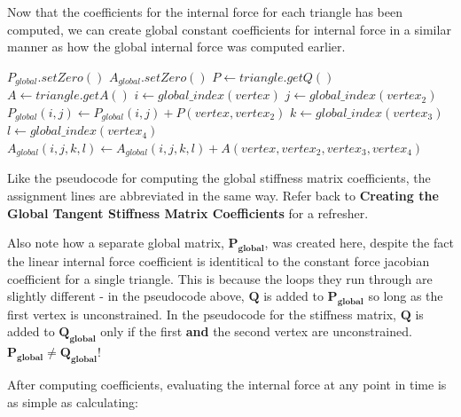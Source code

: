 \documentclass[twocolumn,10pt]{asme2ej}
\begin{document}
Now that the coefficients for the internal force for each triangle has been computed, we can create global constant coefficients for internal force in a similar manner as how the global internal force was computed earlier.

\begin{algorithmic}[1]
        \State $P_{global}.setZero()$
        \State $A_{global}.setZero()$
         \State $P \gets triangle.getQ()$
         \State $A \gets triangle.getA()$
                  \State $i \gets global\_index(vertex)$
                    \State $j \gets global\_index(vertex_2)$
                    \State $P_{global}(i,j) \gets P_{global}(i,j) + P(vertex, vertex_2)$
                          \State $k \gets global\_index(vertex_3)$
                              \State $l \gets global\_index(vertex_4)$
                              \State $A_{global}(i,j,k,l)  \gets A_{global}(i,j,k,l)+A(vertex, vertex_2, vertex_3, vertex_4)$
                            \EndFor
                      \EndFor
                    \EndFor
              \EndIf
            \EndFor
        \EndFor
    \EndFunction
\end{algorithmic}

Like the pseudocode for computing the global stiffness matrix coefficients, the assignment lines are abbreviated in the same way. Refer back to \textbf{Creating the Global Tangent Stiffness Matrix Coefficients} for a refresher.

Also note how a separate global matrix, $\bm{P_{global}}$, was created here, despite the fact the linear internal force coefficient is identitical to the constant force jacobian coefficient for a single triangle. This is because the loops they run through are slightly different - in the pseudocode above, $\bm{Q}$ is added to $\bm{P_{global}}$ so long as the first vertex is unconstrained. In the pseudocode for the stiffness matrix, $\bm{Q}$ is added to $\bm{Q_{global}}$ only if the first \textbf{and} the second vertex are unconstrained. $\bm{P_{global}} \neq \bm{Q_{global}}$!

After computing coefficients, evaluating the internal force at any point in time is as simple as calculating:
\end{document}
